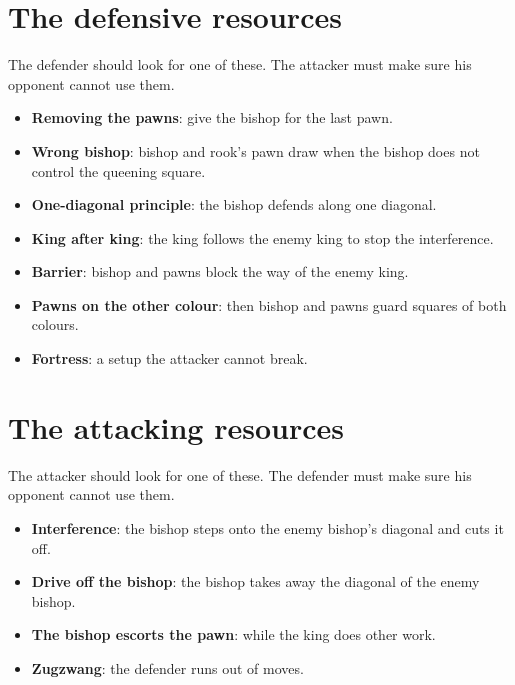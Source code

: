 
\section*{The defensive resources}
The defender should look for one of these. The attacker must make sure his opponent cannot use them.

\begin{itemize}
\item \textbf{Removing the pawns}: give the bishop for the last pawn.

\item \textbf{Wrong bishop}: bishop and rook's pawn draw when the bishop does not control the queening square.

\item \textbf{One-diagonal principle}: the bishop defends along one diagonal.

\item \textbf{King after king}: the king follows the enemy king to stop the interference.

\item \textbf{Barrier}: bishop and pawns block the way of the enemy king.

\item \textbf{Pawns on the other colour}: then bishop and pawns guard squares of both colours.

\item \textbf{Fortress}: a setup the attacker cannot break.
\end{itemize}

\section*{The attacking resources}
The attacker should look for one of these. The defender must make sure his opponent cannot use them.

\begin{itemize}
\item \textbf{Interference}: the bishop steps onto the enemy bishop's diagonal and cuts it off.

\item \textbf{Drive off the bishop}: the bishop takes away the diagonal of the enemy bishop.

\item \textbf{The bishop escorts the pawn}: while the king does other work.

\item \textbf{Zugzwang}: the defender runs out of moves.
\end{itemize}

